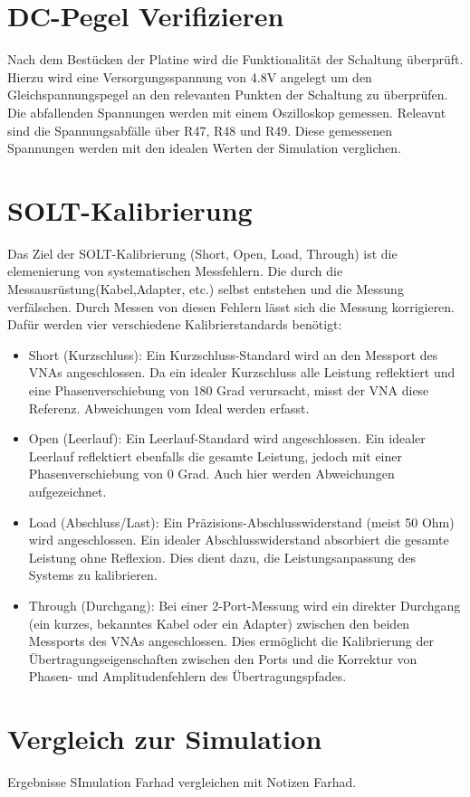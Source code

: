 \section{DC-Pegel Verifizieren}
Nach dem Bestücken der Platine wird die Funktionalität der Schaltung überprüft. Hierzu wird eine Versorgungsspannung von 
4.8V angelegt um den Gleichspannungspegel an den relevanten Punkten der Schaltung zu überprüfen. Die abfallenden 
Spannungen werden mit einem Oszilloskop gemessen. Releavnt sind die Spannungsabfälle über R47, R48 und R49. Diese gemessenen
Spannungen werden mit den idealen Werten 
der Simulation verglichen. 

\section{SOLT-Kalibrierung}
Das Ziel der SOLT-Kalibrierung (Short, Open, Load, Through) ist die elemenierung
von systematischen Messfehlern. Die durch die Messausrüstung(Kabel,Adapter, etc.)
selbst entstehen und die Messung verfälschen.
Durch Messen von diesen Fehlern lässt sich die Messung korrigieren.
Dafür werden vier verschiedene Kalibrierstandards benötigt:
\begin{itemize}
    \item Short (Kurzschluss): Ein Kurzschluss-Standard wird an den Messport des VNAs angeschlossen. Da ein idealer Kurzschluss alle Leistung reflektiert und eine Phasenverschiebung von 180 Grad verursacht, misst der VNA diese Referenz. Abweichungen vom Ideal werden erfasst. 
    \item Open (Leerlauf): Ein Leerlauf-Standard wird angeschlossen. Ein idealer Leerlauf reflektiert ebenfalls die gesamte Leistung, jedoch mit einer Phasenverschiebung von 0 Grad. Auch hier werden Abweichungen aufgezeichnet.
    \item Load (Abschluss/Last): Ein Präzisions-Abschlusswiderstand (meist 50 Ohm) wird angeschlossen. Ein idealer Abschlusswiderstand absorbiert die gesamte Leistung ohne Reflexion. Dies dient dazu, die Leistungsanpassung des Systems zu kalibrieren.
    \item Through (Durchgang): Bei einer 2-Port-Messung wird ein direkter Durchgang (ein kurzes, bekanntes Kabel oder ein Adapter) zwischen den beiden Messports des VNAs angeschlossen. Dies ermöglicht die Kalibrierung der Übertragungseigenschaften zwischen den Ports und die Korrektur von Phasen- und Amplitudenfehlern des Übertragungspfades.
\end{itemize}
\section{Vergleich zur Simulation}
Ergebnisse SImulation Farhad vergleichen mit Notizen Farhad.
\clearpage
